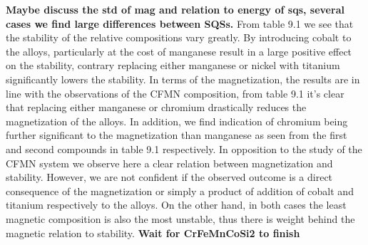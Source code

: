 \textbf{Maybe discuss the std of mag and relation to energy of sqs, several cases we find large differences between SQSs.}
From table 9.1 we see that the stability of the relative compositions vary greatly. By introducing cobalt to the alloys, particularly at the cost of manganese result in a large positive effect on the stability, contrary replacing either manganese or nickel with titanium significantly lowers the stability. In terms of the magnetization, the results are in line with the observations of the CFMN composition, from table 9.1 it's clear that replacing either manganese or chromium drastically reduces the magnetization of the alloys. In addition, we find indication of chromium being further significant to the magnetization than manganese as seen from the first and second compounds in table 9.1 respectively. In opposition to the study of the CFMN system we observe here a clear relation between magnetization and stability. However, we are not confident if the observed outcome is a direct consequence of the magnetization or simply a product of addition of cobalt and titanium respectively to the alloys. On the other hand, in both cases the least magnetic composition is also the most unstable, thus there is weight behind the magnetic relation to stability. \textbf{Wait for CrFeMnCoSi2 to finish}  

\begin{comment}
Bellow we include the calculated PDFs of introducing cobalt to the alloy.   
\begin{figure}[H]
	\centering
	\begin{subfigure}{\textwidth}
		\texttt{[image: results/fesi2/composistions/cofemnni\_PDF.png]}
	\end{subfigure}
	\begin{subfigure}{\textwidth}
		\texttt{[image: results/fesi2/composistions/crfeconi\_PDF.png]}
	\end{subfigure}
	\begin{subfigure}{\textwidth}
		\texttt{[image: results/fesi2/composistions/crfemnco\_PDF.png]}
	\end{subfigure}
	\caption{Probability distribution functions of top: \ch{Co4Fe4Mn4Ni4Si32} (SQS D), middle: \ch{Cr4Fe4Co4Ni4Si32} (SQS B), bottom: \ch{Cr4Fe4Mn4Co4Si32} (SQS B)}
\end{figure}
Similarly we look at the PDFs of \ch{Cr4Fe4Mn4Ti4Si32} and \ch{Cr4Fe4Ti4Ni4Si32} bellow.
\begin{figure}[H]
	\centering
	\begin{subfigure}{\textwidth}
		\texttt{[image: results/fesi2/composistions/crfemnti\_PDF.png]}
	\end{subfigure}
	\begin{subfigure}{\textwidth}
		\texttt{[image: results/fesi2/composistions/crfetini\_PDF.png]}
	\end{subfigure}
	\caption{Probability distribution function of top: \ch{Cr4Fe4Mn4Ti4Si32} (SQS B), bottom: \ch{Cr4Fe4Ti4Ni4Si32} (SQS B))}
\end{figure}
\end{comment}  


